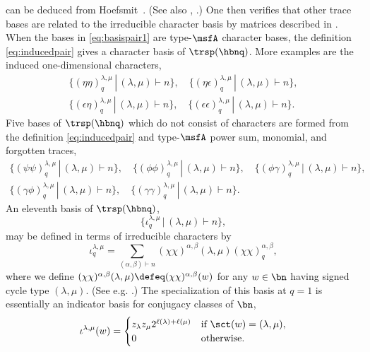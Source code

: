 can be deduced from Hoefsmit~\cite[\S 2.2]{HoefsmitThesis}.
(See also \cite{DJRepHeckeB}, \cite[\S 5.5]{GPCharHecke}.)
One then verifies that other trace bases are related
to the irreducible character basis by
matrices described in \cite[\S 3]{RemTrans}.
When the bases in \eqref{eq:basispair1} are type-$\msfA$ character bases,
the definition \eqref{eq:inducedpair} gives a character basis of
$\trsp(\hbnq)$.
More examples are the
induced one-dimensional characters,
\begin{equation*}
  \begin{gathered}
\{ (\eta\eta)_q^{\lambda,\mu} \,|\, (\lambda,\mu) \vdash n \}, \quad
\{ (\eta\epsilon)_q^{\lambda,\mu} \,|\, (\lambda,\mu) \vdash n \},\\
\{ (\epsilon\eta)_q^{\lambda,\mu} \,|\, (\lambda,\mu) \vdash n \},\quad
\{ (\epsilon\epsilon)_q^{\lambda,\mu} \,|\, (\lambda,\mu) \vdash n \}.
\end{gathered}
\end{equation*}
Five
bases of $\trsp(\hbnq)$ which do not consist of characters are
formed from
the definition \eqref{eq:inducedpair} and
type-$\msfA$ power sum, monomial, and forgotten traces,
\begin{equation*}
  \begin{gathered}
    \{ (\psi\psi)_q^{\lambda,\mu} \,|\, (\lambda,\mu) \vdash n \}, \quad
\{ (\phi\phi)_q^{\lambda,\mu} \,|\, (\lambda,\mu) \vdash n \}, \quad
\{ (\phi\gamma)_q^{\lambda,\mu} \,|\, (\lambda,\mu) \vdash n \}, \\
\{ (\gamma\phi)_q^{\lambda,\mu} \,|\, (\lambda,\mu) \vdash n \},\quad
\{ (\gamma\gamma)_q^{\lambda,\mu} \,|\, (\lambda,\mu) \vdash n \}.
\end{gathered}
\end{equation*}
An eleventh basis of $\trsp(\hbnq)$,
\begin{equation*}
  \{ \iota_q^{\lambda,\mu} \,|\, (\lambda,\mu) \vdash n\},
\end{equation*}
may be defined in terms of irreducible characters by
\begin{equation}\label{eq:iotaqdef}
  \iota_q^{\lambda,\mu} =
  \sum_{(\alpha,\beta) \vdash n} (\chi\chi)^{\alpha,\beta}(\lambda,\mu)
  (\chi\chi)_q^{\alpha,\beta},
\end{equation}
where
we define
$(\chi\chi)^{\alpha,\beta}(\lambda,\mu) \defeq (\chi\chi)^{\alpha,\beta}(w)$
for any $w \in \bn$ having signed cycle type
$(\lambda,\mu)$. (See e.g. \cite{AAERCharFormulasHyper}.)
The specialization of this basis at $q=1$
is 
essentially an indicator basis for conjugacy classes of $\bn$,
\begin{equation}\label{eq:iotadef}
  \iota^{\lambda,\mu}(w) = \begin{cases}
    z_\lambda z_\mu 2^{\ell(\lambda)+\ell(\mu)}
    &\text{if $\sct(w) = (\lambda,\mu)$},\\
    0 &\text{otherwise}.
  \end{cases}
\end{equation}

